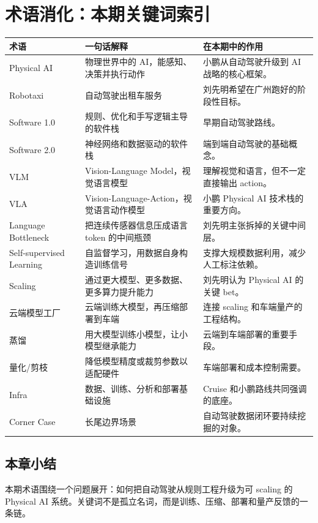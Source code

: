 \section{术语消化：本期关键词索引}

\begin{longtable}{p{}p{}p{}}
\toprule
术语 & 一句话解释 & 在本期中的作用 \\
\midrule
Physical AI & 物理世界中的 AI，能感知、决策并执行动作 & 小鹏从自动驾驶升级到 AI 战略的核心框架。 \\
Robotaxi & 自动驾驶出租车服务 & 刘先明希望在广州跑好的阶段性目标。 \\
Software 1.0 & 规则、优化和手写逻辑主导的软件栈 & 早期自动驾驶路线。 \\
Software 2.0 & 神经网络和数据驱动的软件栈 & 端到端自动驾驶的基础概念。 \\
VLM & Vision-Language Model，视觉语言模型 & 理解视觉和语言，但不一定直接输出 action。 \\
VLA & Vision-Language-Action，视觉语言动作模型 & 小鹏 Physical AI 技术栈的重要方向。 \\
Language Bottleneck & 把连续传感器信息压成语言 token 的中间瓶颈 & 刘先明主张拆掉的关键中间层。 \\
Self-supervised Learning & 自监督学习，用数据自身构造训练信号 & 支撑大规模数据利用，减少人工标注依赖。 \\
Scaling & 通过更大模型、更多数据、更多算力提升能力 & 刘先明认为 Physical AI 的关键 bet。 \\
云端模型工厂 & 云端训练大模型，再压缩部署到车端 & 连接 scaling 和车端量产的工程结构。 \\
蒸馏 & 用大模型训练小模型，让小模型继承能力 & 云端到车端部署的重要手段。 \\
量化/剪枝 & 降低模型精度或裁剪参数以适配硬件 & 车端部署和成本控制需要。 \\
Infra & 数据、训练、分析和部署基础设施 & Cruise 和小鹏路线共同强调的底座。 \\
Corner Case & 长尾边界场景 & 自动驾驶数据闭环要持续挖掘的对象。 \\
\bottomrule
\end{longtable}

\subsection{本章小结}

本期术语围绕一个问题展开：如何把自动驾驶从规则工程升级为可 scaling 的 Physical AI 系统。关键词不是孤立名词，而是训练、压缩、部署和量产反馈的一条链。

